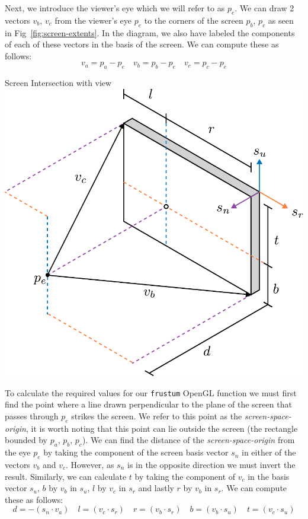 Next, we introduce the viewer's eye which we will refer to as $p_e$. We can draw 2 vectors $v_b$, $v_c$ from the viewer's eye $p_e$ to the corners of the screen $p_b$, $p_c$ as seen in Fig~\ref{fig:screen-extents}. In the diagram, we also have labeled the components of each of these vectors in the basis of the screen. We can compute these as follows:
\[ v_a = p_a - p_e \quad v_b = p_b - p_e \quad v_c = p_c - p_e\] 

\begin{figureBox}[label={fig:screen-extents}, width=0.75\linewidth]{Screen Intersection with view}
    \includegraphics[width = 0.5\linewidth]{./background/figures/projection/eye-projection.pdf}
\end{figureBox}


To calculate the required values for our \texttt{frustum} OpenGL function we must first find the point where a line drawn perpendicular to the plane of the screen that passes through $p_e$ strikes the screen. We refer to this point as the {\it screen-space-origin}, it is worth noting that this point can lie outside the screen (the rectangle bounded by $p_a$, $p_b$, $p_c$). We can find the distance of the {\it screen-space-origin} from the eye $p_e$ by taking the component of the screen basis vector $s_n$ in either of the vectors $v_b$ and $v_c$. However, as $s_n$ is in the opposite direction we must invert the result. Similarly, we can calculate $t$ by taking the component of $v_c$ in the basis vector $s_u$, $b$ by $v_b$ in $s_u$, $l$ by $v_c$ in $s_r$ and lastly $r$ by $v_b$ in $s_r$. We can compute these as follows:
\[ d= -(s_n \cdot v_a) \quad l = (v_c \cdot s_r) \quad r = (v_b \cdot s_r) \quad b = (v_b \cdot s_u) \quad t = (v_c \cdot s_u) \]


